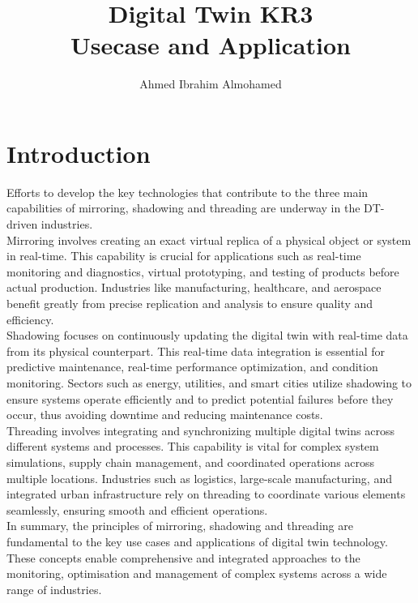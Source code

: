 \documentclass[12pt]{article}
\title{
    Digital Twin KR3 \\ \large Usecase and Application
}
\author{
    Ahmed Ibrahim Almohamed
}
\begin{document}
\maketitle

\newpage

\section*{Introduction}

Efforts to develop the key technologies that contribute to the 
three main capabilities of mirroring,
shadowing and threading are underway in the DT-driven industries.\cite{jiang2021industrial} \\
Mirroring involves creating an exact virtual replica of a physical object or system in real-time. This capability is crucial for applications such as real-time monitoring and diagnostics, virtual prototyping, and testing of products before actual production. Industries like manufacturing, healthcare, and aerospace benefit greatly from precise replication and analysis to ensure quality and efficiency.
\\Shadowing focuses on continuously updating the digital twin with real-time data from its physical counterpart. This real-time data integration is essential for predictive maintenance, real-time performance optimization, and condition monitoring. Sectors such as energy, utilities, and smart cities utilize shadowing to ensure systems operate efficiently and to predict potential failures before they occur, thus avoiding downtime and reducing maintenance costs.\cite{jiang2021industrial}
\\Threading involves integrating and synchronizing multiple digital twins across different systems and processes. This capability is vital for complex system simulations, supply chain management, and coordinated operations across multiple locations. Industries such as logistics, large-scale manufacturing, and integrated urban infrastructure rely on threading to coordinate various elements seamlessly, ensuring smooth and efficient operations.\cite{jiang2021industrial}
\\ In summary, the principles of mirroring, shadowing and threading are fundamental to the key use cases and applications of digital twin technology. These concepts enable comprehensive and integrated approaches to the monitoring, optimisation and management of complex systems across a wide range of industries.
\newpage



\end{document}
